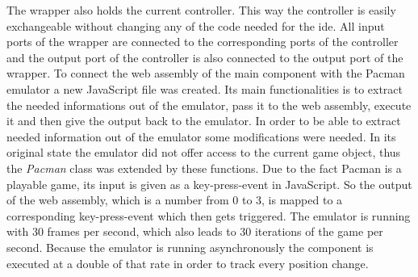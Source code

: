 The wrapper also holds the current controller. This way the controller is easily exchangeable without changing any of the code needed for the ide. All input ports of the wrapper are connected to the corresponding ports of the controller and the output port of the controller is also connected to the output port of the wrapper. \newline
To connect the web assembly of the main component with the Pacman emulator a new JavaScript file was created. Its main functionalities is to extract the needed informations out of the emulator, pass it to the web assembly, execute it and then give the output back to the emulator. In order to be able to extract needed information out of the emulator some modifications were needed. In its original state the emulator did not offer access to the current game object, thus the \textit{Pacman} class was extended by these functions. Due to the fact Pacman is a playable game, its input is given as a key-press-event in JavaScript. So the output of the web assembly, which is a number from 0 to 3, is mapped to a corresponding key-press-event which then gets triggered. The emulator is running with 30 frames per second, which also leads to 30 iterations of the game per second. Because the emulator is running asynchronously the component is executed at a double of that rate in order to track every position change.

